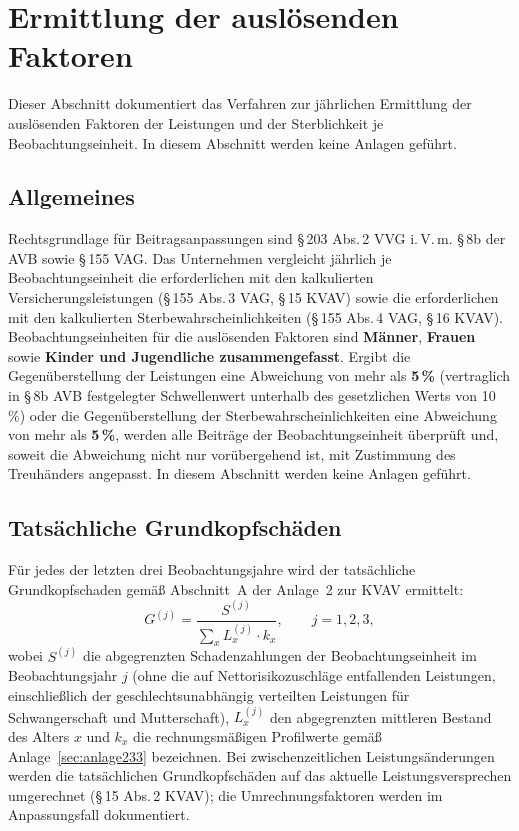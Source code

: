 \section{Ermittlung der auslösenden Faktoren}\label{sec:af}

Dieser Abschnitt dokumentiert das Verfahren zur jährlichen Ermittlung
der auslösenden Faktoren der Leistungen und der Sterblichkeit je
Beobachtungseinheit. In diesem Abschnitt werden keine Anlagen geführt.

\subsection{Allgemeines}\label{sec:af-allgemein}

Rechtsgrundlage für Beitragsanpassungen sind \S\,203 Abs.\,2 VVG
i.\,V.\,m. \S\,8b der AVB sowie \S\,155 VAG. Das Unternehmen vergleicht
jährlich je Beobachtungseinheit die erforderlichen mit den kalkulierten
Versicherungsleistungen (\S\,155 Abs.\,3 VAG, \S\,15 KVAV) sowie die
erforderlichen mit den kalkulierten Sterbewahrscheinlichkeiten
(\S\,155 Abs.\,4 VAG, \S\,16 KVAV). Beobachtungseinheiten für die
auslösenden Faktoren sind \textbf{Männer}, \textbf{Frauen} sowie
\textbf{Kinder und Jugendliche zusammengefasst}. Ergibt die
Gegenüberstellung der Leistungen eine Abweichung von mehr als
\textbf{5\,\%} (vertraglich in \S\,8b AVB festgelegter Schwellenwert
unterhalb des gesetzlichen Werts von 10\,\%) oder die
Gegenüberstellung der Sterbewahrscheinlichkeiten eine Abweichung von
mehr als \textbf{5\,\%}, werden alle Beiträge der Beobachtungseinheit
überprüft und, soweit die Abweichung nicht nur vorübergehend ist, mit
Zustimmung des Treuhänders angepasst. In diesem Abschnitt werden keine
Anlagen geführt.

\subsection{Tatsächliche Grundkopfschäden}\label{sec:af-gks}

Für jedes der letzten drei Beobachtungsjahre wird der tatsächliche
Grundkopfschaden gemäß Abschnitt~A der Anlage~2 zur KVAV ermittelt:
\begin{equation}
G^{(j)} = \frac{S^{(j)}}{\sum_{x} L^{(j)}_x \cdot k_x},
\qquad j = 1,2,3,
\label{eq:af-gks}
\end{equation}
wobei $S^{(j)}$ die abgegrenzten Schadenzahlungen der
Beobachtungseinheit im Beobachtungsjahr $j$ (ohne die auf
Nettorisikozuschläge entfallenden Leistungen, einschließlich der
geschlechtsunabhängig verteilten Leistungen für Schwangerschaft und
Mutterschaft), $L^{(j)}_x$ den abgegrenzten mittleren Bestand des
Alters $x$ und $k_x$ die rechnungsmäßigen Profilwerte gemäß
Anlage~\ref{sec:anlage233} bezeichnen. Bei zwischenzeitlichen Leistungsänderungen
werden die tatsächlichen Grundkopfschäden auf das aktuelle
Leistungsversprechen umgerechnet (\S\,15 Abs.\,2 KVAV); die
Umrechnungsfaktoren werden im Anpassungsfall dokumentiert.

